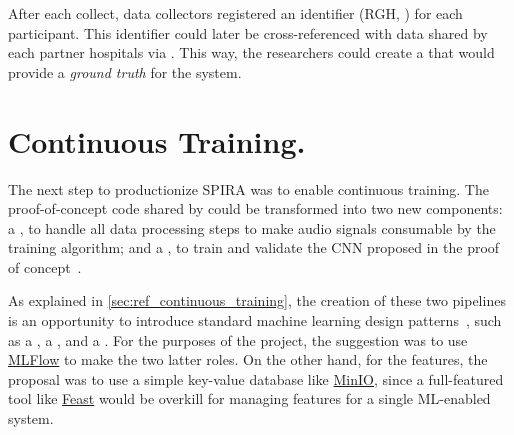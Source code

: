  After each collect, data collectors registered an identifier
  (RGH, ) for each participant.
  This identifier could later be cross-referenced with data shared by each
  partner hospitals via . This way, the
  researchers could create a  that
  would provide a \emph{ground truth} for the system.
  
  \section{Continuous Training.}\label{sec:spira_continuous_training}
  The next step to productionize SPIRA was to enable continuous training.
  The proof-of-concept code shared by \citeauthor{Casanova2021DeepSpeech}
  could be transformed into two new components:
    a ,
    to handle all data processing steps to make audio signals consumable
    by the training algorithm; and
    a , to train and validate the CNN
    proposed in the proof of concept~\parencite{Casanova2021DeepSpeech}.
  
  As explained in \cref{sec:ref_continuous_training}, the creation of these
  two pipelines is an opportunity to introduce standard machine learning
  design patterns~\parencite{Lakshmanan2020MachineMLOps}, such as
    a ,
    a , and
    a .
  For the purposes of the project, the suggestion was to use
  \href{https://mlflow.org}{MLFlow} to make the two latter roles.
  On the other hand, for the features, the proposal was to use a
  simple key-value database like \href{https://min.io}{MinIO},
  since a full-featured tool like \href{https://feast.dev}{Feast}
  would be overkill for managing features for a single ML-enabled system.
  
